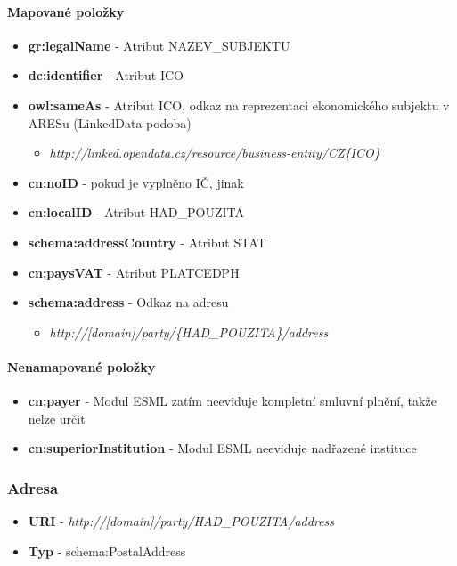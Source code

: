 \paragraph*{Mapované položky}
\begin{itemize}
\item \textbf{gr:legalName} - Atribut NAZEV\_SUBJEKTU
\item \textbf{dc:identifier} - Atribut ICO
\item \textbf{owl:sameAs} - Atribut ICO, odkaz na reprezentaci ekonomického subjektu v ARESu (LinkedData podoba)
	\begin{itemize}
	\item \textit{http://linked.opendata.cz/resource/business-entity/CZ\{ICO\}}
	\end{itemize}
\item \textbf{cn:noID} -  pokud je vyplněno IČ, jinak 
\item \textbf{cn:localID} - Atribut HAD\_POUZITA
\item \textbf{schema:addressCountry} - Atribut STAT
\item \textbf{cn:paysVAT} - Atribut PLATCEDPH
\item \textbf{schema:address} - Odkaz na adresu
	\begin{itemize}
	\item \textit{http://[domain]/party/\{HAD\_POUZITA\}/address}
	\end{itemize}
\end{itemize}

\paragraph*{Nenamapované položky}
\begin{itemize}
\item \textbf{cn:payer} - Modul ESML zatím neeviduje kompletní smluvní plnění, takže nelze určit 
\item \textbf{cn:superiorInstitution} - Modul ESML neeviduje nadřazené instituce
\end{itemize}

\subsubsection{Adresa}

\begin{itemize}
\item \textbf{URI} - \textit{http://[domain]/party/{HAD\_POUZITA}/address}
\item \textbf{Typ} - schema:PostalAddress
\end{itemize}

